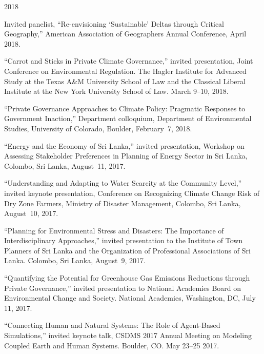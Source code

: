   2018
\item Invited panelist, ``Re-envisioning `Sustainable' Deltas through Critical
  Geography,'' American Association of Geographers Annual Conference, April
  2018.
\item ``Carrot and Sticks in Private Climate Governance,'' invited
  presentation, Joint Conference on Environmental Regulation. The Hagler
  Institute for Advanced Study at the Texas A\&M University School of Law and
  the Classical Liberal Institute at the New York University School of Law.
  March 9--10, 2018.
\item ``Private Governance Approaches to Climate Policy: Pragmatic Responses to
  Government Inaction,'' Department colloquium, Department of Environmental
  Studies, University of Colorado, Boulder, February~7, 2018.
\item ``Energy and the Economy of Sri Lanka,'' invited presentation, Workshop
  on Assessing Stakeholder Preferences in Planning of Energy Sector in Sri
  Lanka, Colombo, Sri Lanka, August~11, 2017.
\item ``Understanding and Adapting to Water Scarcity at the Community Level,''
  invited keynote presentation, Conference on Recognizing Climate Change Risk
  of Dry Zone Farmers, Ministry of Disaster Management, Colombo, Sri Lanka,
  August~10, 2017.
\item ``Planning for Environmental Stress and Disasters: The Importance of
  Interdisciplinary Approaches,'' invited presentation to the Institute of Town
  Planners of Sri Lanka and the Organization of Professional Associations of
  Sri Lanka. Colombo, Sri Lanka, August~9, 2017.
\item ``Quantifying the Potential for Greenhouse Gas Emissions Reductions
  through Private Governance,'' invited presentation to National Academies
  Board on Environmental Change and Society. National Academies, Washington,
  DC, July 11, 2017.
\item  ``Connecting Human and Natural Systems: The Role of Agent-Based
  Simulations,'' invited keynote talk, CSDMS 2017 Annual Meeting on Modeling
  Coupled Earth and Human Systems. Boulder, CO. May 23--25 2017.
